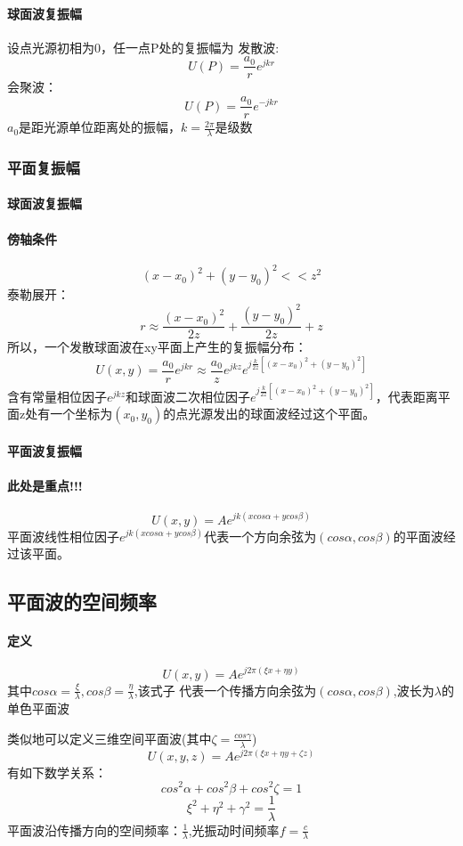 \documentclass[UTF8]{ctexart}
\newcommand{\f}[2]{\frac{#1}{#2}}%
\begin{document}
\paragraph{球面波复振幅}
设点光源初相为0，任一点P处的复振幅为
发散波: \[
    U(P)=\f{a_{0}}{r}e^{jkr}
\]
会聚波：\[
    U(P)=\f{a_{0}}{r}e^{-jkr}    
\]
$a_{0}$是距光源单位距离处的振幅，$k=\f{2\pi}{\lambda}$是级数

\subsubsection{平面复振幅}
\paragraph{球面波复振幅}
\paragraph{傍轴条件}\[
    (x-x_{0})^2+(y-y_{0})^2<<z^2
    \]
    泰勒展开：\[
        r\approx\f{(x-x_{0})^2}{2z}+\f{(y-y_{0})^2}{2z}+z\]
所以，一个发散球面波在xy平面上产生的复振幅分布：
\[
    U(x,y)=\f{a_{0}}{r}e^{jkr}
    \approx\f{a_{0}}{z}e^{jkz}e^{j\f{k}{2z}[(x-x_{0})^2+(y-y_{0})^2]}
    \]
含有常量相位因子$e^{jkz}$和球面波二次相位因子$e^{j\f{k}{2z}[(x-x_{0})^2+(y-y_{0})^2]}$，代表距离平面z处有一个坐标为$(x_{0},y_{0})$的点光源发出的球面波经过这个平面。
\paragraph{平面波复振幅}
\paragraph{此处是重点!!!}\[
    U(x,y)=Ae^{jk(xcos\alpha+ycos\beta)}\]        
平面波线性相位因子$e^{jk(xcos\alpha+ycos\beta)}$代表一个方向余弦为$(cos\alpha,cos\beta)$的平面波经过该平面。
\subsection{平面波的空间频率}
\paragraph{定义}\[U(x,y)=Ae^{j2\pi(\xi x+\eta y)}\]
其中$cos\alpha=\f{\xi}{\lambda},cos\beta=\f{\eta}{\lambda}$,该式子
代表一个传播方向余弦为$(cos\alpha,cos\beta)$,波长为$\lambda$的单色平面波

类似地可以定义三维空间平面波(其中$\zeta=\f{cos\gamma}{\lambda}$)
\[U(x,y,z)=Ae^{j2\pi(\xi x+\eta y+\zeta z)}
\]
有如下数学关系：
\[cos^{2}\alpha+cos^{2}\beta+cos^{2}\zeta =1
    \]
    \[\xi^{2}+\eta^{2}+\gamma^{2}=\f{1}{\lambda}
        \]
    平面波沿传播方向的空间频率：$\f{1}{\lambda}$,光振动时间频率$f=\f{c}{\lambda}$
\end{document}
